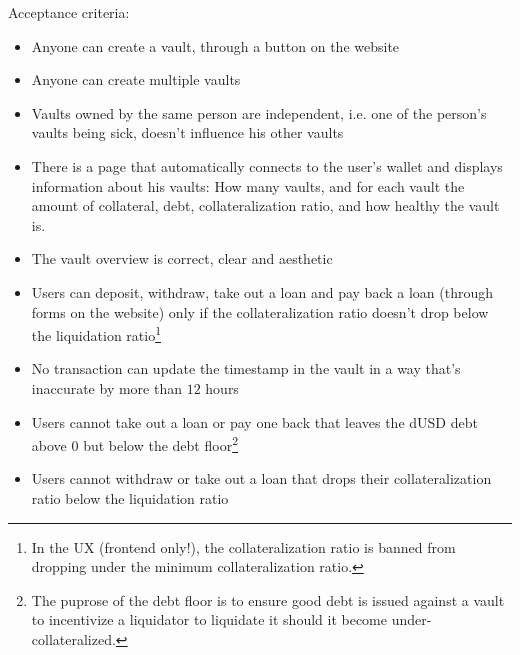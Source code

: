 \documentclass{article} %
\begin{document}
Acceptance criteria:
\begin{itemize}
  \item Anyone can create a vault, through a button on the website
  \item Anyone can create multiple vaults
  \item Vaults owned by the same person are independent, i.e. one of the
    person's vaults being sick, doesn't influence his other vaults
  \item There is a page that automatically connects to the user's wallet and
    displays information about his vaults: How many vaults, and for each vault
    the amount of collateral, debt, collateralization ratio, and how healthy the
    vault is.
  \item The vault overview is correct, clear and aesthetic
  \item Users can deposit, withdraw, take out a loan and pay back a loan
    (through forms on the website) only if the collateralization ratio doesn't
    drop below the liquidation ratio\footnote{
      In the UX (frontend only!), the collateralization ratio is banned from
      dropping under the minimum collateralization ratio.}
  \item No transaction can update the timestamp in the vault in a way that's
    inaccurate by more than $12$ hours
  \item Users cannot take out a loan or pay one back that leaves the dUSD debt
    above $0$ but below the debt floor\footnote{
    The puprose of the debt floor is to ensure good debt is issued against a
    vault to incentivize a liquidator to liquidate it should it become
    under-collateralized.}
  \item Users cannot withdraw or take out a loan that drops their
    collateralization ratio below the liquidation ratio

\end{itemize}
\end{document}
